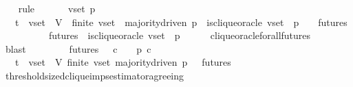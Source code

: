 \begin{isabellebody}
%
\isadelimproof
\ \ %
\endisadelimproof
%
\isatagproof
{}\isamarkupfalse%
\ rule{\isacharplus}\isanewline
{}\isamarkupfalse%
\ {\isacharminus}\isanewline
\ \ \isamarkupfalse%
\ {\isasymsigma}\ v{\isacharunderscore}set\ p\ {\isasymsigma}{\isacharprime}\isanewline
\ \isamarkupfalse%
\ {\isachardoublequoteopen}{\isasymsigma}\ {\isasymin}\ {\isasymSigma}t\ {\isasymand}\ v{\isacharunderscore}set\ {\isasymsubseteq}\ V{\isachardoublequoteclose}\ \ {\isachardoublequoteopen}finite\ v{\isacharunderscore}set{\isachardoublequoteclose}\ \ {\isachardoublequoteopen}majority{\isacharunderscore}driven\ p{\isachardoublequoteclose}\ \ {\isachardoublequoteopen}is{\isacharunderscore}clique{\isacharunderscore}oracle\ {\isacharparenleft}v{\isacharunderscore}set{\isacharcomma}\ {\isasymsigma}{\isacharcomma}\ p{\isacharparenright}{\isachardoublequoteclose}\ \ {\isachardoublequoteopen}{\isasymsigma}{\isacharprime}\ {\isasymin}\ futures\ {\isasymsigma}{\isachardoublequoteclose}\ \isanewline
\ \isamarkupfalse%
\ \isamarkupfalse%
\ {\isachardoublequoteopen}{\isasymforall}\ {\isasymsigma}{\isacharprime}\ {\isasymin}\ futures\ {\isasymsigma}{\isachardot}\ is{\isacharunderscore}clique{\isacharunderscore}oracle\ {\isacharparenleft}v{\isacharunderscore}set{\isacharcomma}\ {\isasymsigma}{\isacharprime}{\isacharcomma}\ p{\isacharparenright}{\isachardoublequoteclose}\ \isanewline
\ \ \ \isamarkupfalse%
\ clique{\isacharunderscore}oracle{\isacharunderscore}for{\isacharunderscore}all{\isacharunderscore}futures\isanewline
\ \ \ \isamarkupfalse%
\ blast\ \isanewline
\ \isamarkupfalse%
\ \isamarkupfalse%
\ {\isachardoublequoteopen}{\isasymforall}\ {\isasymsigma}{\isacharprime}\ {\isasymin}\ futures\ {\isasymsigma}{\isachardot}\ {\isasymforall}\ c\ {\isasymin}\ {\isasymepsilon}\ {\isasymsigma}{\isacharprime}{\isachardot}\ p\ c{\isachardoublequoteclose}\isanewline
\ \ \ \isamarkupfalse%
\ {\isacartoucheopen}{\isasymsigma}\ {\isasymin}\ {\isasymSigma}t\ {\isasymand}\ v{\isacharunderscore}set\ {\isasymsubseteq}\ V{\isacartoucheclose}\ {\isacartoucheopen}finite\ v{\isacharunderscore}set{\isacartoucheclose}\ {\isacartoucheopen}majority{\isacharunderscore}driven\ p{\isacartoucheclose}\ {\isacartoucheopen}{\isasymsigma}{\isacharprime}\ {\isasymin}\ futures\ {\isasymsigma}{\isacartoucheclose}\isanewline
\ \ \ \isamarkupfalse%
\ threshold{\isacharunderscore}sized{\isacharunderscore}clique{\isacharunderscore}imps{\isacharunderscore}estimator{\isacharunderscore}agreeing\ \isanewline

\end{isabellebody}
